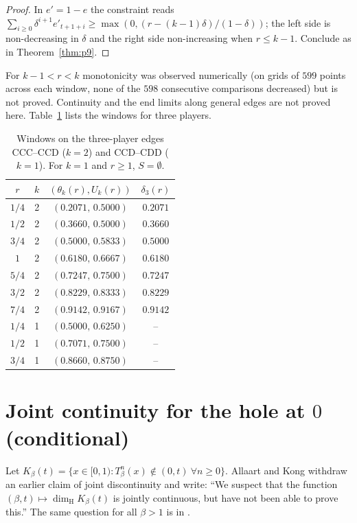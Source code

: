 \documentclass[11pt]{amsart}
\theoremstyle{remark}
\newcommand{\dimH}{\dim_{\mathrm H}}
\begin{document}
\begin{proof}
In $e'=1-e$ the constraint reads $\sum_{i\ge0}\delta^{i+1}e'_{t+1+i}\ge\max(0,(r-(k-1)\delta)/(1-\delta))$; the left side is non-decreasing in $\delta$ and the right side non-increasing when $r\le k-1$. Conclude as in Theorem~\ref{thm:p9}.
\end{proof}

For $k-1<r<k$ monotonicity was observed numerically (on grids of $599$ points across each window, none of the $598$ consecutive comparisons decreased) but is not proved. Continuity and the end limits along general edges are not proved here. Table~\ref{tab:windows} lists the windows for three players.

\begin{table}[h]
\centering
\begin{tabular}{cccc}
\toprule
$r$ & $k$ & $(\theta_k(r),U_k(r))$ & $\delta_3(r)$ \\
\midrule
$1/4$ & 2 & $(0.2071,\,0.5000)$ & $0.2071$\\
$1/2$ & 2 & $(0.3660,\,0.5000)$ & $0.3660$\\
$3/4$ & 2 & $(0.5000,\,0.5833)$ & $0.5000$\\
$1$ & 2 & $(0.6180,\,0.6667)$ & $0.6180$\\
$5/4$ & 2 & $(0.7247,\,0.7500)$ & $0.7247$\\
$3/2$ & 2 & $(0.8229,\,0.8333)$ & $0.8229$\\
$7/4$ & 2 & $(0.9142,\,0.9167)$ & $0.9142$\\
$1/4$ & 1 & $(0.5000,\,0.6250)$ & --\\
$1/2$ & 1 & $(0.7071,\,0.7500)$ & --\\
$3/4$ & 1 & $(0.8660,\,0.8750)$ & --\\
\bottomrule
\end{tabular}
\caption{Windows on the three-player edges CCC--CCD ($k=2$) and CCD--CDD ($k=1$). For $k=1$ and $r\ge1$, $S=\emptyset$.}\label{tab:windows}
\end{table}

\section{\texorpdfstring{Joint continuity for the hole at $0$ (conditional)}{Joint continuity for the hole at 0 (conditional)}}\label{sec:E}

Let $K_\beta(t)=\{x\in[0,1):T_\beta^n(x)\notin(0,t)\ \forall n\ge0\}$. Allaart and Kong \cite[Remark~1.10, arXiv v2]{AKcrit} withdraw an earlier claim of joint discontinuity and write: ``We suspect that the function $(\beta,t)\mapsto\dimH K_\beta(t)$ is jointly continuous, but have not been able to prove this.'' The same question for all $\beta>1$ is in \cite[Remark~1.2, arXiv v3]{AKgen}.
\end{document}
